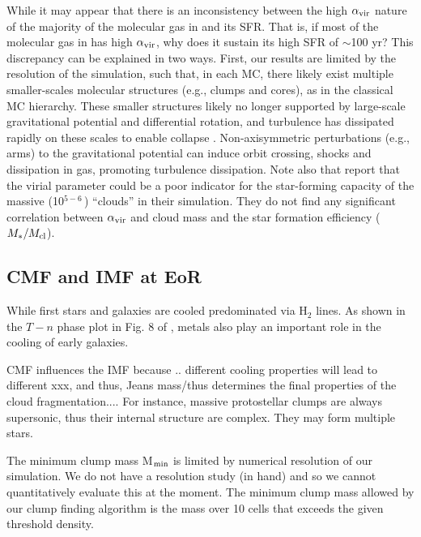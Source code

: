 \documentclass[apj]{emulateapj} %
\begin{document}
While it may appear that there is an inconsistency between the high $\alpha_{\rm vir}$ 
nature of the majority of the molecular gas in \flower and its SFR. 
That is, if most of the molecular gas in \flower has high $\alpha_{\rm vir}$, why does it sustain its high SFR of $\sim$100\,\Msun\,yr\pmOne?
This discrepancy can be explained in two ways. 
First, our results are limited by the resolution of the simulation, such that, in each MC, there 
likely exist multiple smaller-scales molecular structures (e.g., clumps and cores), 
as in the classical MC hierarchy. These smaller structures likely no longer supported by large-scale gravitational potential and differential rotation, 
and turbulence has dissipated rapidly on these scales to enable collapse \citep{Clark04a}.
Non-axisymmetric perturbations (e.g., arms) to the gravitational potential 
can induce orbit crossing, shocks and dissipation in gas, promoting turbulence dissipation.
Note also that \citet{Pettitt18a} report that the virial parameter could be a poor indicator 
for the star-forming capacity of the massive (10$^{5-6}$\,\Msun) ``clouds'' in their simulation. They 
do not find any significant correlation between $\alpha_{\rm vir}$ and cloud mass 
and the star formation efficiency ($M_*/M_{\rm cl}$).


\subsection{CMF and IMF at EoR}

While first stars and galaxies are cooled predominated via H$_2$ lines. 
As shown in the $T-n$ phase plot in Fig. 8 of \citealt{Pallottini17b}, metals also play an important role in the cooling of early galaxies.


CMF influences the IMF because .. different cooling properties will lead to different xxx, and thus, Jeans mass/thus determines the final properties of the cloud fragmentation....  For instance, massive protostellar clumps are always supersonic, thus their internal structure are complex. They may form multiple stars.


The minimum clump mass M$_{\rm min}$ is limited by numerical resolution of our simulation. We do not have a resolution study (in hand) and so we cannot quantitatively evaluate this at the moment. The minimum clump mass allowed 
by our clump finding algorithm is the mass over 10 cells that exceeds the given threshold density.



\end{document}
